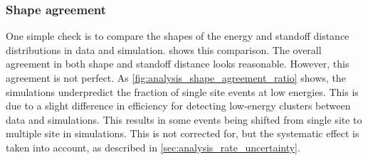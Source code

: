 \documentclass[herrin-thesis.tex]{subfiles}
\begin{document}
\subsubsection{Shape agreement}
\label{sec:analysis_shape_agreement}
One simple check is to compare the shapes of the energy and standoff distance distributions in data and simulation.  shows this comparison. The overall agreement in both shape and standoff distance looks reasonable. However, this agreement is not perfect. As \cref{fig:analysis_shape_agreement_ratio} shows, the simulations underpredict the fraction of single site events at low energies. This is due to a slight difference in efficiency for detecting low-energy clusters between data and simulations. This results in some events being shifted from single site to multiple site in simulations. This is not corrected for, but the systematic effect is taken into account, as described in \cref{sec:analysis_rate_uncertainty}.
\end{document}
